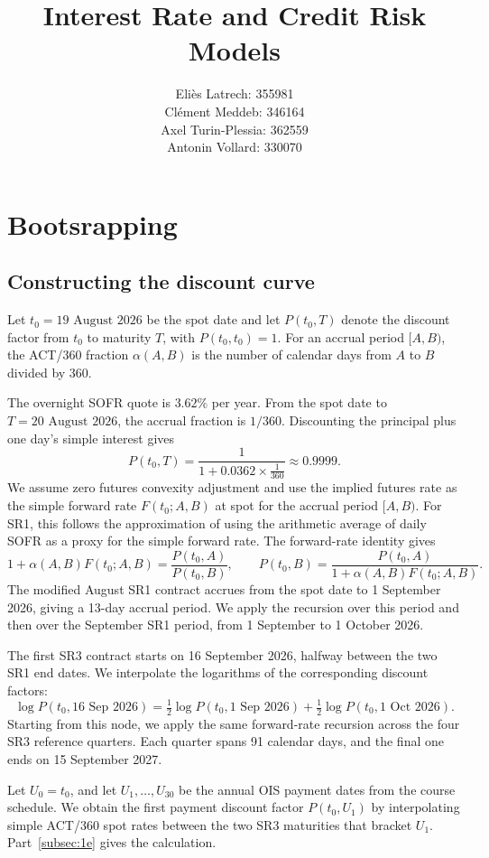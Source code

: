 \documentclass[11pt,a4paper]{article}
\title{Interest Rate and Credit Risk Models}
\author{Eliès Latrech: 355981\\
        Clément Meddeb: 346164\\
        Axel Turin-Plessia: 362559\\
        Antonin Vollard: 330070}
\begin{document}
\maketitle

\section{Bootsrapping}

\subsection{Constructing the discount curve}\label{subsec:1a}

Let \(t_0=\text{19 August 2026}\) be the spot date and let
\(P(t_0,T)\) denote the discount factor from \(t_0\) to maturity
\(T\), with \(P(t_0,t_0)=1\). For an accrual period \([A,B)\),
the ACT/360 fraction \(\alpha(A,B)\) is the number of calendar
days from \(A\) to \(B\) divided by 360.

The overnight SOFR quote is \(3.62\%\) per year. From the spot date
to \(T=\text{20 August 2026}\), the accrual fraction is \(1/360\).
Discounting the principal plus one day's simple interest gives
\[
P(t_0,T)=\frac{1}{1+0.0362\times\frac{1}{360}}
    \approx 0.9999.
\]
We assume zero futures convexity adjustment and use the implied
futures rate as the simple forward rate \(F(t_0;A,B)\) at spot
for the accrual period \([A,B)\). For SR1,
this follows the approximation of using the arithmetic
average of daily SOFR as a proxy for the simple forward rate.
The forward-rate identity gives
\[
1+\alpha(A,B)F(t_0;A,B)=\frac{P(t_0,A)}{P(t_0,B)},
\qquad
P(t_0,B)=\frac{P(t_0,A)}{1+\alpha(A,B)F(t_0;A,B)}.
\]
The modified August SR1 contract accrues from the spot date to
1 September 2026, giving a 13-day accrual period. We apply the
recursion over this period and then over the September SR1
period, from 1 September to 1 October 2026.

The first SR3 contract starts on 16 September 2026, halfway
between the two SR1 end dates. We interpolate the logarithms of
the corresponding discount factors:
\[
\log P(t_0,\text{16 Sep 2026})
  = \tfrac12\log P(t_0,\text{1 Sep 2026})
  + \tfrac12\log P(t_0,\text{1 Oct 2026}).
\]
Starting from this node, we apply the same forward-rate recursion
across the four SR3 reference quarters. Each quarter
spans 91 calendar days, and the final one ends on
15 September 2027.

Let \(U_0=t_0\), and let \(U_1,\ldots,U_{30}\) be the annual
OIS payment dates from the course schedule. We obtain the first
payment discount factor \(P(t_0,U_1)\) by interpolating simple
ACT/360 spot rates between the two SR3 maturities that bracket
\(U_1\). Part~\ref{subsec:1e} gives the calculation.
\end{document}
